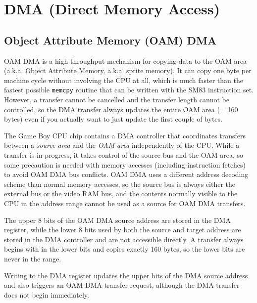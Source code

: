 \documentclass[\main/gbctr.tex]{subfiles}
\begin{document}
\chapter{DMA (Direct Memory Access)}

\section{Object Attribute Memory (OAM) DMA}

OAM DMA is a high-throughput mechanism for copying data to the OAM area (a.k.a.
Object Attribute Memory, a.k.a. sprite memory). It can copy one byte per
machine cycle without involving the CPU at all, which is much faster than the
fastest possible \texttt{memcpy} routine that can be written with the SM83
instruction set. However, a transfer cannot be cancelled and the transfer
length cannot be controlled, so the DMA transfer always updates the entire OAM
area (= 160 bytes) even if you actually want to just update the first couple of
bytes.

The Game Boy CPU chip contains a DMA controller that coordinates transfers
between a \emph{source area} and the \emph{OAM area} independently of the CPU.
While a transfer is in progress, it takes control of the source bus and the OAM
area, so some precaution is needed with memory accesses (including instruction
fetches) to avoid OAM DMA bus conflicts. OAM DMA uses a different address
decoding scheme than normal memory accesses, so the source bus is always either
the external bus or the video RAM bus, and the contents normally visible to the
CPU in the  address range cannot be used as a source for
OAM DMA transfers.

The upper 8 bits of the OAM DMA source address are stored in the DMA register,
while the lower 8 bits used by both the source and target address are stored in
the DMA controller and are not accessible directly. A transfer always begins
with  in the lower bits and copies exactly 160 bytes, so the lower bits
are never in the  range.

Writing to the DMA register updates the upper bits of the DMA source address
and also triggers an OAM DMA transfer request, although the DMA transfer does
not begin immediately.
\end{document}
